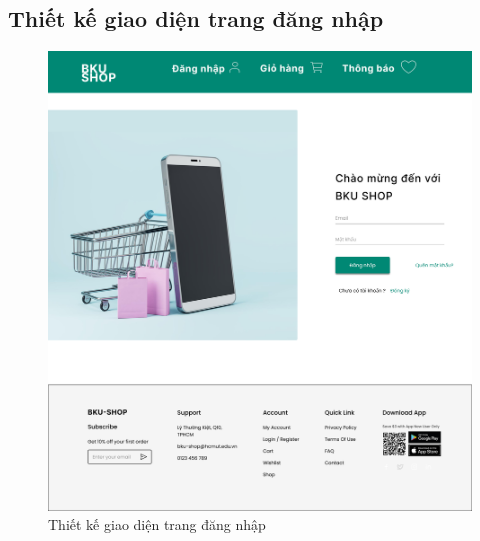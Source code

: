 \subsection {Thiết kế giao diện trang đăng nhập}
\begin{figure}[H]
    \begin{center}
    \includegraphics[scale=0.2]{images/hieu/chap-4/login.jpg}
    \vspace*{5mm}
    \caption{Thiết kế giao diện trang đăng nhập}
    \end{center}
\end{figure}
